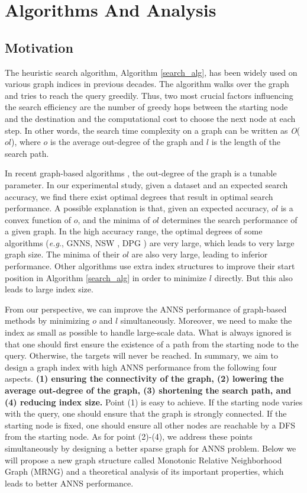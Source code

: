 \documentclass{vldb}
\def\eg {\emph{e.g}.} \def\Eg{\emph{E.g}.}
\begin{document}
\section{Algorithms And Analysis}
\subsection{Motivation}
\label{Motivation}
The heuristic search algorithm, Algorithm \ref{search_alg}, has been widely used on various graph indices in previous decades. The algorithm walks over the graph and tries to reach the query greedily. Thus, two most crucial factors influencing the search efficiency are the number of greedy hops between the starting node and the destination and the computational cost to choose the next node at each step. In other words, the search time complexity on a graph can be written as \textit{O}($ol$), where $o$ is the average out-degree of the graph and $l$ is the length of the search path. 

In recent graph-based algorithms \cite{Hajebi2011Fast, Ben2016Fanng, malkov2014approximate, li2016approximate, Jin2014Fast, CongEfanna2016, MalkovYHNSW16}, the out-degree of the graph is a tunable parameter. In our experimental study, given a dataset and an expected search accuracy, we find there exist optimal degrees that result in optimal search performance. A possible explanation is that, given an expected accuracy, $ol$ is a convex function of $o$, and the minima of $ol$ determines the search performance of a given graph. In the high accuracy range, the optimal degrees of some algorithms (\eg, GNNS\cite{Hajebi2011Fast}, NSW \cite{malkov2014approximate}, DPG \cite{li2016approximate}) are very large, which leads to very large graph size. The minima of their $ol$ are also very large, leading to inferior performance. Other algorithms \cite{Jin2014Fast, CongEfanna2016, MalkovYHNSW16} use extra index structures to improve their start position in Algorithm \ref{search_alg} in order to minimize $l$ directly. But this also leads to large index size.

From our perspective, we can improve the ANNS performance of graph-based methods by minimizing $o$ and $l$ simultaneously. Moreover, we need to make the index as small as possible to handle large-scale data. What is always ignored is that one should first ensure the existence of a path from the starting node to the query. Otherwise, the targets will never be reached. In summary, we aim to design a graph index with high ANNS performance from the following four aspects. \textbf{(1) ensuring the connectivity of the graph, (2) lowering the average out-degree of the graph, (3) shortening the search path, and (4) reducing index size.} Point (1) is easy to achieve. If the starting node varies with the query, one should ensure that the graph is strongly connected. If the starting node is fixed, one should ensure all other nodes are reachable by a DFS from the starting node. As for point (2)-(4), we address these points simultaneously by designing a better sparse graph for ANNS problem. Below we will propose a new graph structure called Monotonic Relative Neighborhood Graph (MRNG) and a theoretical analysis of its important properties, which leads to better ANNS performance. 
\end{document}
